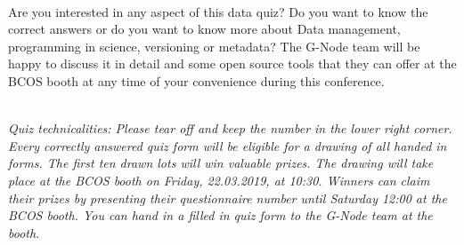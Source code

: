\documentclass[8pt,BCOR10mm,oneside,headsepline]{scrartcl}
\begin{document}
\paragraph{}

Are you interested in any aspect of this data quiz? Do you want to know the correct answers or do you want to know more about Data management, programming in science, versioning or metadata? The G-Node team will be happy to discuss it in detail and some open source tools that they can offer at the BCOS booth at any time of your convenience during this conference.

~\\

\noindent \textit{Quiz technicalities: Please tear off and keep the number in the lower right corner. Every correctly answered quiz form will be eligible for a drawing of all handed in forms. The first ten drawn lots will win valuable prizes. The drawing will take place at the BCOS booth on Friday, 22.03.2019, at 10:30. Winners can claim their prizes by presenting their questionnaire number until Saturday 12:00 at the BCOS booth. You can hand in a filled in quiz form to the G-Node team at the booth.}
\end{document}
